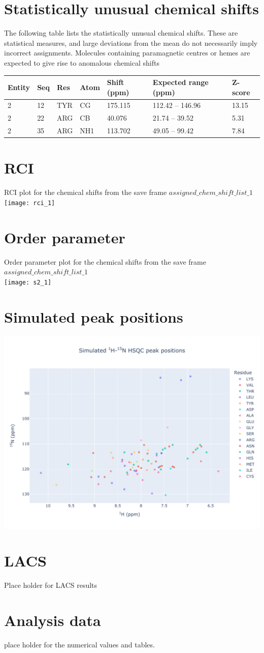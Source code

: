 \section{Statistically unusual chemical shifts}
The following table lists the statistically unusual chemical shifts. These are statistical measures, and large deviations from the mean do not necessarily imply incorrect assignments. Molecules containing paramagnetic centres or hemes are expected to give rise to anomalous chemical shifts\\\begin{longtable}{|l|l|l|l|l|l|l|}
\hline
Entity & Seq & Res & Atom & Shift (ppm) & Expected range (ppm) & Z-score\\\hline
2 & 12 & TYR & CG & 175.115 & 112.42 -- 146.96 & 13.15\\
\hline
2 & 22 & ARG & CB & 40.076 & 21.74 -- 39.52 & 5.31\\
\hline
2 & 35 & ARG & NH1 & 113.702 & 49.05 -- 99.42 & 7.84\\
\hline
\end{longtable}

\section{RCI}
RCI plot for the chemical shifts from the  save frame $assigned\_chem\_shift\_list\_1$\\ \texttt{[image: rci\_1]}\\

\section{Order parameter}
Order parameter plot for the chemical shifts from the  save frame $assigned\_chem\_shift\_list\_1$\\ \texttt{[image: s2\_1]}\\

\section{Simulated peak positions}
\includegraphics[width=18cm]{7354_n15.pdf}\\

\section{LACS}
Place holder for LACS results
\section{Analysis data}
place holder for the numerical values and tables.
